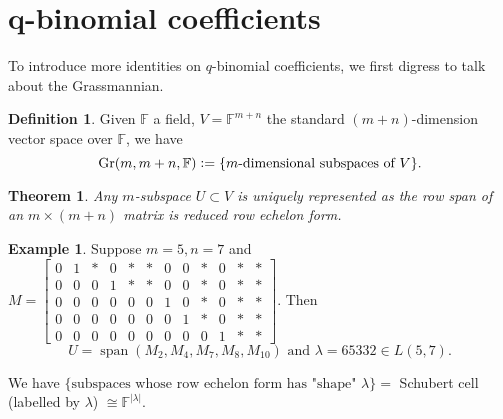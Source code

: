 \documentclass{report}
\newcommand{\F}{\mathbb{F}}
\def \Gr {\operatorname{Gr}}
\newcommand{\defeq}{\vcentcolon=}
\newtheorem{theorem}{Theorem}[section]
\theoremstyle{definition}
\newtheorem{definition}{Definition}[section]
\newtheorem{example}{Example}[section]
\theoremstyle{remark}
\numberwithin{equation}{section}
\newcommand*\ttlmath[2]{\texorpdfstring{$\boldsymbol{#1}$}{#2}}
\begin{document}
\section{\ttlmath{q}{q}-binomial coefficients}
To introduce more identities on $q$-binomial coefficients, we first digress to talk about the Grassmannian.
\begin{definition}
    Given $\F$ a field, $V = \F^{m + n}$ the standard $(m+n)$-dimension vector space over $\F$, we have \[
        \Gr(m, m+n, \F) \defeq \{\text{$m$-dimensional subspaces of $V$}\}.
    \]
\end{definition}
\begin{theorem}
    Any $m$-subspace $U \subset V$ is uniquely represented as the row span of an $m \times (m + n)$ matrix is \emph{reduced row echelon form}.
\end{theorem}
\setcounter{MaxMatrixCols}{20}
\begin{example}
    Suppose $m = 5, n = 7$ and $M = \begin{bmatrix}
        0 & 1 & * & 0 & * & * & 0 & 0 & * & 0 & * & * \\
        0 & 0 & 0 & 1 & * & * & 0 & 0 & * & 0 & * & * \\
        0 & 0 & 0 & 0 & 0 & 0 & 1 & 0 & * & 0 & * & * \\
        0 & 0 & 0 & 0 & 0 & 0 & 0 & 1 & * & 0 & * & * \\
        0 & 0 & 0 & 0 & 0 & 0 & 0 & 0 & 0 & 1 & * & * 
    \end{bmatrix}$.
    Then \[U = \operatorname{span}\left(M_2, M_4, M_7, M_8, M_{10}\right) \text{ and } \lambda = 65332 \in L(5, 7).
    \]
\end{example}
We have $\{\text{subspaces whose row echelon form has "shape" $\lambda$}\} = $ Schubert cell (labelled by $\lambda$) $\cong \F^{|\lambda|}$.
\end{document}
